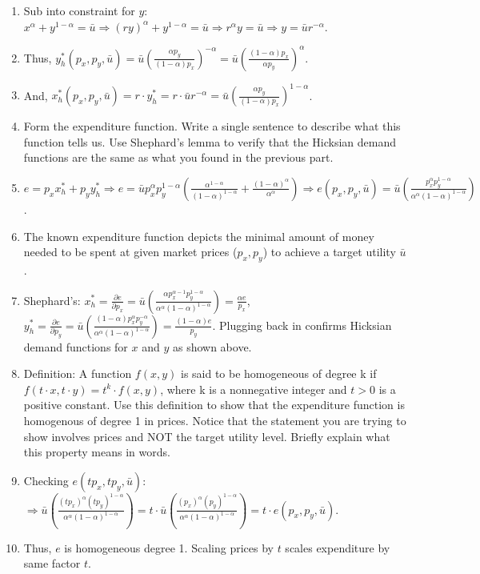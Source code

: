 \documentclass{article}
\begin{document}
\begin{enumerate}
\begin{enumerate}[label=(\alph*)]
\item[] Sub into constraint for $y$: $x^\alpha+y^{1-\alpha}=\bar u \Rightarrow (ry)^\alpha+y^{1-\alpha}=\bar u \Rightarrow r^\alpha y=\bar u \Rightarrow y=\bar ur^{-\alpha}$.
\item[] Thus, $y_h^*(p_x,p_y,\bar u)=\bar u(\frac{\alpha p_y}{(1-\alpha)p_x})^{-\alpha}=\bar u(\frac{(1-\alpha)p_x}{\alpha p_y})^{\alpha}$.
\item[] And, $x^*_h(p_x,p_y,\bar u)=r\cdot y^*_h=r\cdot\bar ur^{-\alpha}=\bar u(\frac{\alpha p_y}{(1-\alpha)p_x})^{1-\alpha}$.
\item Form the expenditure function. Write a single sentence to describe what this function tells us. Use Shephard’s lemma to verify that the Hicksian demand functions are the same as what you found in the previous part.
\item[] $e=p_xx_h^*+p_yy_h^* \Rightarrow e=\bar up^\alpha_xp_y^{1-\alpha}(\frac{\alpha^{1-\alpha}}{(1-\alpha)^{1-\alpha}}+\frac{(1-\alpha)^{\alpha}}{\alpha^{\alpha}}) \Rightarrow e(p_x,p_y,\bar u)=\bar u(\frac{p_x^\alpha p_y^{1-\alpha}}{\alpha^\alpha(1-\alpha)^{1-\alpha}})$.
\item[] The known expenditure function depicts the minimal amount of money needed to be spent at given market prices ($p_x,p_y$) to achieve a target utility $\bar u$.
\item[] Shephard's: $x_h^*=\frac{\partial e}{\partial p_x}=\bar u(\frac{\alpha p_x^{\alpha-1}p_y^{1-\alpha}}{\alpha^\alpha (1-\alpha)^{1-\alpha}})=\frac{\alpha e}{p_x}$, $y_h^*=\frac{\partial e}{\partial p_y}=\bar u(\frac{(1-\alpha) p_x^{\alpha}p_y^{-\alpha}}{\alpha^\alpha (1-\alpha)^{1-\alpha}})=\frac{(1-\alpha) e}{p_y}$. Plugging back in confirms Hicksian demand functions for $x$ and $y$ as shown above.
\item Definition: A function $f(x, y)$ is said to be homogeneous of degree k if $f(t · x, t · y) = t^k · f(x, y)$, where k is a nonnegative integer and $t > 0$ is a positive constant. Use this definition to show that the expenditure function is homogenous of degree 1 in prices. Notice that the statement you are trying to show involves prices and NOT the target utility level. Briefly explain what this property means in words.
\item[] Checking $e(tp_x,tp_y,\bar u)$: $\Rightarrow \bar u(\frac{(tp_x)^\alpha(tp_y)^{1-\alpha}}{\alpha^\alpha(1-\alpha)^{1-\alpha}})=t\cdot\bar u(\frac{(p_x)^\alpha(p_y)^{1-\alpha}}{\alpha^\alpha(1-\alpha)^{1-\alpha}})=t\cdot e(p_x,p_y,\bar u)$.
\item[] Thus, $e$ is homogeneous degree 1. Scaling prices by $t$ scales expenditure by same factor $t$.

\end{enumerate}
\end{enumerate}
\end{document}
